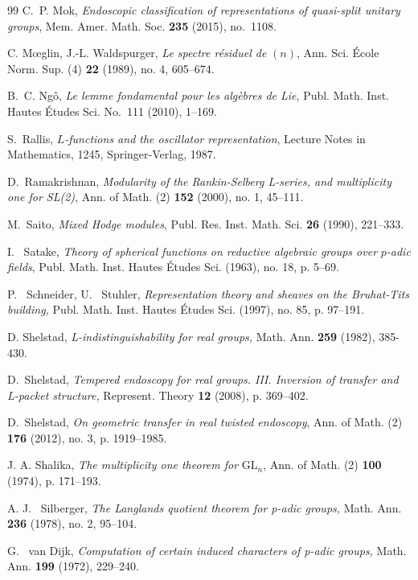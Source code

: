 \documentclass[12pt]{amsart}
\theoremstyle{definition}
\begin{document}
\begin{thebibliography}{99}
C.~P. Mok, \textit{Endoscopic classification of representations of quasi-split unitary groups}, {Mem. Amer. Math. Soc.} \textbf{235} (2015), no.~1108.

C. Mœglin, J.-L. Waldspurger, \textit{Le spectre résiduel de} $(n)$, Ann. Sci.
\'Ecole Norm. Sup. (4) \textbf{22} (1989), no. 4, 605–674.

B.~C. Ngô, \textit{Le lemme fondamental pour les algèbres de Lie}, {Publ. Math. Inst. Hautes Études Sci.} No.~111 (2010), 1--169.

S.~Rallis, \emph{$L$-functions and the oscillator representation}, Lecture Notes in Mathematics, 1245, Springer-Verlag, 1987.

D.~Ramakrishnan, \textit{Modularity of the Rankin-Selberg L-series, and multiplicity
one for SL(2)}, Ann. of Math. (2) \textbf{152 }(2000), no. 1, 45–111.

M.~Saito, \textit{Mixed Hodge modules}, {Publ. Res. Inst. Math. Sci.} \textbf{26} (1990), 221--333.

I. ~Satake, \textit{Theory of spherical functions on reductive algebraic groups over} $p$\textit{-adic fields},
Publ. Math. Inst. Hautes Études Sci. (1963), no. 18, p. 5–69.

P. ~Schneider,  U. ~Stuhler, \textit{Representation theory and sheaves on the Bruhat-Tits building,} Publ. Math. Inst. Hautes Études Sci. (1997), no. 85, p. 97–191.

D. Shelstad, \textit{L-indistinguishability for real groups,} Math. Ann. \textbf{259} (1982), 385-430.

D.~Shelstad, \textit{Tempered endoscopy for real groups. III. Inversion of transfer and L-packet
structure,} Represent. Theory \textbf{12} (2008), p. 369–402.
 

 
D.~Shelstad,\textit{ On geometric transfer in real twisted endoscopy}, Ann. of Math. (2) \textbf{176} (2012),
no. 3, p. 1919–1985.

J. A. Shalika, \textit{The multiplicity one theorem for} GL$_n$, Ann. of Math. (2) \textbf{100} (1974),
p. 171–193.

A. J. ~Silberger, \textit{The Langlands quotient theorem for p-adic groups,} Math. Ann. \textbf{236}
(1978), no. 2, 95–104.


G. ~van Dijk, \textit{Computation of certain induced characters of p-adic groups,} Math. Ann.
\textbf{199} (1972), 229–240.


\end{thebibliography}
\end{document}
